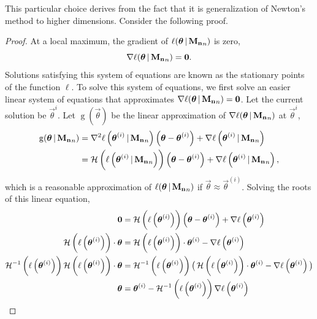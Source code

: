 \documentclass[
    11pt,
    extrafontsizes,
    article,
    oldfontcommands,
    final,
    oneside,
    openany,
    hidelinks]{memoir}
\begin{document}
This particular choice derives from the fact that it is generalization of Newton's method to higher dimensions. Consider the following proof.
\begin{proof}
At a local maximum, the gradient of $\ell(\boldsymbol{\mathbf{\theta}} {\,|\,} \boldsymbol{\mathbf{M_n}}_n)$ is zero,
\begin{equation*}
\nabla \ell(\boldsymbol{\mathbf{\theta}} {\,|\,} \boldsymbol{\mathbf{M_n}}_n) = \boldsymbol{\mathbf{0}}.
\end{equation*}
Solutions satisfying this system of equations are known as the stationary points of the function $\ell$. To solve this system of equations, we first solve an easier linear system of equations that approximates $\nabla \ell(\boldsymbol{\mathbf{\theta}} {\,|\,} \boldsymbol{\mathbf{M_n}}_n) = \boldsymbol{\mathbf{0}}$. 
Let the current solution be $\vec\theta^{i}$. Let $\operatorname{g}(\vec\theta)$ be the linear approximation of $\nabla \ell(\boldsymbol{\mathbf{\theta}} {\,|\,} \boldsymbol{\mathbf{M_n}}_n)$ at $\vec\theta^{i}$,
\begin{align*}
    \operatorname{g}(\boldsymbol{\mathbf{\theta}} {\,|\,} \boldsymbol{\mathbf{M_n}}_n)
        &= \nabla^2 \ell \left(\boldsymbol{\mathbf{\theta}}^{(i)} {\,|\,} \boldsymbol{\mathbf{M_n}}_n \right)\left(\boldsymbol{\mathbf{\theta}} - \boldsymbol{\mathbf{\theta}}^{(i)} \right) + \nabla \ell \left(\boldsymbol{\mathbf{\theta}}^{(i)} {\,|\,} \boldsymbol{\mathbf{M_n}}_n \right)\\
        &= \operatorname{\mathcal{H}} \left ( \ell \left(\boldsymbol{\mathbf{\theta}}^{(i)} {\,|\,} \boldsymbol{\mathbf{M_n}}_n \right) \right ) \left(\boldsymbol{\mathbf{\theta}} - \boldsymbol{\mathbf{\theta}}^{(i)} \right) + \nabla \ell \left(\boldsymbol{\mathbf{\theta}}^{(i)} {\,|\,} \boldsymbol{\mathbf{M_n}}_n \right),
\end{align*}
which is a reasonable approximation of $\ell(\boldsymbol{\mathbf{\theta}} {\,|\,} \boldsymbol{\mathbf{M_n}}_n)$ if $\vec\theta \approx \vec\theta^{(i)}$. Solving the roots of this linear equation,
\begin{align*}
    \vec{0} &= \hessian \left(\ell \left(\vec\theta^{(i)}\right)\right) \left(\vec\theta - \vec\theta^{(i)} \right) + \nabla \ell \left(\vec\theta^{(i)}\right)\\
    \hessian \left ( \ell \left(\vec\theta^{(i)}\right) \right ) \cdot \vec\theta &= \hessian \left ( \ell \left(\vec\theta^{(i)}\right) \right ) \cdot \vec\theta^{(i)} - \nabla \ell \left(\vec\theta^{(i)}\right)\\
    \hessian^{-1}\left ( \ell \left(\vec\theta^{(i)}\right) \right ) \hessian \left ( \ell \left(\vec\theta^{(i)}\right) \right ) \cdot \vec\theta &= \hessian^{-1} \left( \ell \left(\vec\theta^{(i)}\right) \right ) \big ( \hessian \left ( \ell \left(\vec\theta^{(i)}\right) \right ) \cdot \vec\theta^{(i)} - \nabla \ell \left(\vec\theta^{(i)}\right) \big )\\
    \vec\theta &= \vec\theta^{(i)} - \hessian^{-1} \left( \ell \left(\vec\theta^{(i)}\right) \right ) \nabla \ell \left(\vec\theta^{(i)}\right)

\end{align*}
\end{proof}
\end{document}
